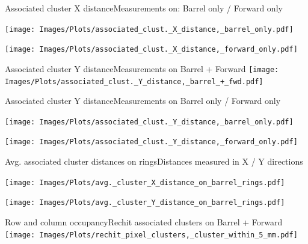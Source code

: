 \documentclass{beamer}
\begin{document}
\begin{frame}{Associated cluster X distance}{Measurements on: Barrel only / Forward only}
  \begin{minipage}{0.49\textwidth}
    \centering
    \texttt{[image: Images/Plots/associated\_clust.\_X\_distance,\_barrel\_only.pdf]}
  \end{minipage}%
  \hspace{0.01\textwidth}%
  \begin{minipage}{0.49\textwidth}
    \centering
    \texttt{[image: Images/Plots/associated\_clust.\_X\_distance,\_forward\_only.pdf]}
  \end{minipage}
\end{frame}

\begin{frame}{Associated cluster Y distance}{Measurements on Barrel + Forward}
    \centering
    \texttt{[image: Images/Plots/associated\_clust.\_Y\_distance,\_barrel\_+\_fwd.pdf]}
\end{frame}

\begin{frame}{Associated cluster Y distance}{Measurements on Barrel only / Forward only}
  \begin{minipage}{0.49\textwidth}
    \centering
    \texttt{[image: Images/Plots/associated\_clust.\_Y\_distance,\_barrel\_only.pdf]}
  \end{minipage}%
  \hspace{0.01\textwidth}%
  \begin{minipage}{0.49\textwidth}
    \centering
    \texttt{[image: Images/Plots/associated\_clust.\_Y\_distance,\_forward\_only.pdf]}
  \end{minipage}
\end{frame}

\begin{frame}{Avg. associated cluster distances on rings}{Distances measured in X / Y directions}
  \begin{minipage}{0.49\textwidth}
    \centering
    \texttt{[image: Images/Plots/avg.\_cluster\_X\_distance\_on\_barrel\_rings.pdf]}
  \end{minipage}%
  \hspace{0.01\textwidth}%
  \begin{minipage}{0.49\textwidth}
    \centering
    \texttt{[image: Images/Plots/avg.\_cluster\_Y\_distance\_on\_barrel\_rings.pdf]}
  \end{minipage}%
\end{frame}

\begin{frame}{Row and column occupancy}{Rechit associated clusters on Barrel + Forward}
  \centering
  \texttt{[image: Images/Plots/rechit\_pixel\_clusters,\_cluster\_within\_5\_mm.pdf]}
\end{frame}
\end{document}
